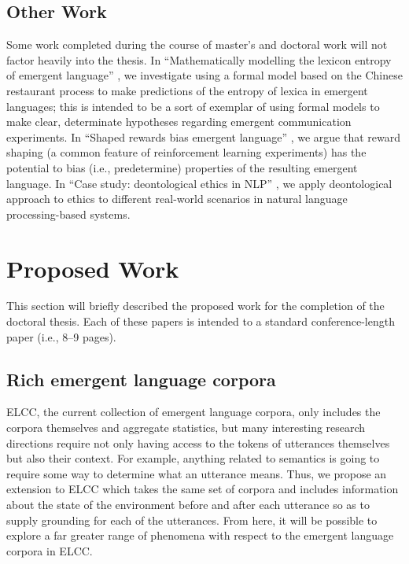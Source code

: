 \subsection{Other Work}
Some work completed during the course of master's and doctoral work will not factor heavily into the thesis.
In ``Mathematically modelling the lexicon entropy of emergent language'' \citep{boldt2023mathmodel}, we investigate using a formal model based on the Chinese restaurant process to make predictions of the entropy of lexica in emergent languages; this is intended to be a sort of exemplar of using formal models to make clear, determinate hypotheses regarding emergent communication experiments.
In ``Shaped rewards bias emergent language'' \citep{boldt2022shaped}, we argue that reward shaping (a common feature of reinforcement learning experiments) has the potential to bias (i.e., predetermine) properties of the resulting emergent language.
In ``Case study: deontological ethics in NLP'' \citep{prabhumoye-etal-2021-case}, we apply deontological approach to ethics to different real-world scenarios in natural language processing-based systems.



\section{Proposed Work}
This section will briefly described the proposed work for the completion of the doctoral thesis.
Each of these papers is intended to a standard conference-length paper (i.e., 8--9 pages).


\subsection{Rich emergent language corpora}
ELCC, the current collection of emergent language corpora, only includes the corpora themselves and aggregate statistics, but many interesting research directions require not only having access to the tokens of utterances themselves but also their context.
For example, anything related to semantics is going to require some way to determine what an utterance means.
Thus, we propose an extension to ELCC which takes the same set of corpora and includes information about the state of the environment before and after each utterance so as to supply grounding for each of the utterances.
From here, it will be possible to explore a far greater range of phenomena with respect to the emergent language corpora in ELCC\@.

